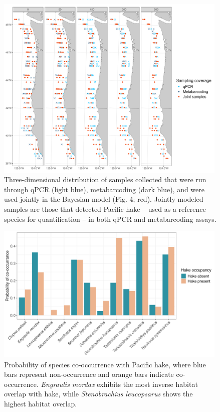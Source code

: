 \documentclass[9pt,twoside,lineno]{pnas-SI}
\begin{document}
\begin{figure}
\centering
\includegraphics[width=0.99\textwidth]{plots/7_Supplementary_Figure_3.jpg}
\caption{Three-dimensional distribution of samples collected that were run through qPCR (light blue), metabarcoding (dark blue), and were used jointly in the Bayesian model (Fig. 4; red). Jointly modeled samples are those that detected Pacific hake -- used as a reference species for quantification -- in both qPCR and metabarcoding assays.}
\end{figure}

\begin{figure}
\centering
\includegraphics[width=0.99\textwidth]{plots/8_Supplementary_Figure_4.jpg}
\caption{Probability of species co-occurrence with Pacific hake, where blue bars represent non-occurrence and orange bars indicate co-occurrence. \textit{Engraulis mordax} exhibits the most inverse habitat overlap with hake, while \textit{Stenobrachius leucopsarus} shows the highest habitat overlap.}
\end{figure}
\end{document}
